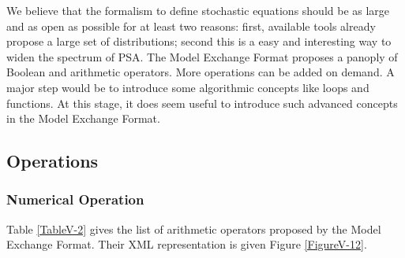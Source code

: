 \documentclass[11pt]{article}
\begin{document}
We believe that the formalism to define stochastic equations should be
as large and as open as possible for at least two reasons: first,
available tools already propose a large set of distributions; second
this is a easy and interesting way to widen the spectrum of PSA. The
Model Exchange Format proposes a panoply of Boolean and arithmetic
operators. More operations can be added on demand. A major step would be
to introduce some algorithmic concepts like loops and functions. At this
stage, it does seem useful to introduce such advanced concepts in the
Model Exchange Format.

\subsection{Operations}
\label{sec:org40437c1}

\subsubsection{Numerical Operation}
\label{sec:org9be4c87}

Table \ref{TableV-2} gives the list of arithmetic operators proposed by the Model
Exchange Format. Their XML representation is given Figure \ref{FigureV-12}.
\end{document}
